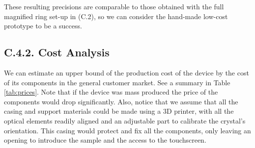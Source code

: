 \documentclass[11pt, a4paper, twoside]{article} %
\begin{document}
These resulting precisions are comparable to those obtained with the full magnified ring set-up in (C.2), so we can consider the hand-made low-cost prototype to be a success.\vspace{-0.2cm}

\subsection*{C.4.2. Cost Analysis\vspace{-0.1cm}}
We can estimate an upper bound of the production cost of the device by the cost of its components in the general customer market. See a summary in Table \ref{tab:prices}. Note that if the device was mass produced the price of the components would drop significantly. Also, notice that we assume that all the casing and support materials could be made using a 3D printer, with all the optical elements readily aligned and an adjustable part to calibrate the crystal's orientation. This casing would protect and fix all the components, only leaving an opening to introduce the sample and the access to the touchscreen.\vspace{-0.1cm}
\end{document}

